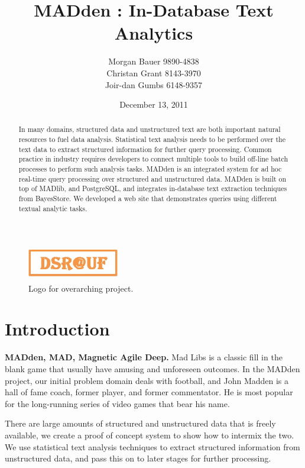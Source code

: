 \documentclass[11pt,onecolumn]{article}
\title{MADden : In-Database Text Analytics}
\author{Morgan Bauer 9890-4838 \\
  Christan Grant 8143-3970 \\
  Joir-dan Gumbs 6148-9357}
\date{December 13, 2011}
\newcommand{\system}{MADden\xspace}
\begin{document}
\maketitle

\begin{figure}
  \begin{center}
    \includegraphics[width=40mm]{logo.jpg}
    \caption{Logo for overarching project.}
    \label{fig:logo}
  \end{center}
\end{figure}


\begin{abstract}
In many domains, structured data and unstructured text are
both important natural resources to fuel data analysis. Statistical
text analysis needs to be performed over the text data to extract
structured information for further query processing. Common practice
in industry requires developers to connect multiple tools to build
off-line batch processes to perform such analysis tasks. \system is
an integrated system for ad hoc real-time query processing over
structured and unstructured data. \system is built on top of MADlib,
and PostgreSQL, and integrates in-database text extraction
techniques from BayesStore. 
We developed a web site that demonstrates queries using different
textual analytic tasks.
\end{abstract}


  \section{Introduction}

  \textbf{\system, MAD, Magnetic Agile Deep.}
  Mad Libs is a classic fill in the blank game that usually have amusing and unforeseen outcomes.
  In the \system project, our initial problem domain deals with football,
  and John Madden is a hall of fame coach, former player, and former commentator.
	He is most popular
  for the long-running series of video games that bear his name.

    There are large amounts of structured and unstructured data that is freely available,
		we create a proof of concept system to show how to intermix the two.
    We use statistical text analysis techniques to extract structured information from unstructured 
		data, and pass this on to later stages for further processing.
\end{document}
